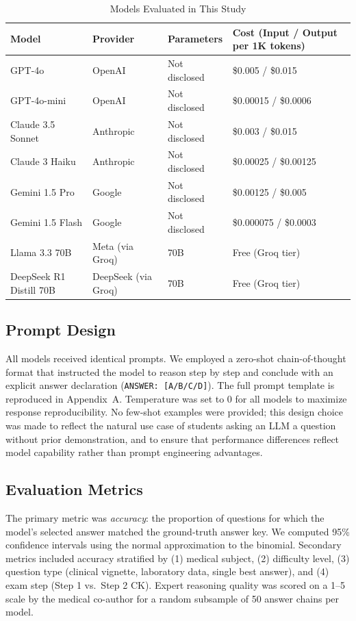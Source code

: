 \begin{table}[htbp]
\centering
\caption{Models Evaluated in This Study}
\label{tab:models}
\begin{tabular}{llll}
\toprule
Model & Provider & Parameters & Cost (Input / Output per 1K tokens) \\
\midrule
GPT-4o & OpenAI & Not disclosed & \$0.005 / \$0.015 \\
GPT-4o-mini & OpenAI & Not disclosed & \$0.00015 / \$0.0006 \\
Claude 3.5 Sonnet & Anthropic & Not disclosed & \$0.003 / \$0.015 \\
Claude 3 Haiku & Anthropic & Not disclosed & \$0.00025 / \$0.00125 \\
Gemini 1.5 Pro & Google & Not disclosed & \$0.00125 / \$0.005 \\
Gemini 1.5 Flash & Google & Not disclosed & \$0.000075 / \$0.0003 \\
Llama 3.3 70B & Meta (via Groq) & 70B & Free (Groq tier) \\
DeepSeek R1 Distill 70B & DeepSeek (via Groq) & 70B & Free (Groq tier) \\
\bottomrule
\end{tabular}
\end{table}

\subsection{Prompt Design}

All models received identical prompts. We employed a zero-shot chain-of-thought format that instructed the model to reason step by step and conclude with an explicit answer declaration (\texttt{ANSWER: [A/B/C/D]}). The full prompt template is reproduced in Appendix~A. Temperature was set to 0 for all models to maximize response reproducibility. No few-shot examples were provided; this design choice was made to reflect the natural use case of students asking an LLM a question without prior demonstration, and to ensure that performance differences reflect model capability rather than prompt engineering advantages.

\subsection{Evaluation Metrics}

The primary metric was \textit{accuracy}: the proportion of questions for which the model's selected answer matched the ground-truth answer key. We computed 95\% confidence intervals using the normal approximation to the binomial. Secondary metrics included accuracy stratified by (1) medical subject, (2) difficulty level, (3) question type (clinical vignette, laboratory data, single best answer), and (4) exam step (Step 1 vs.\ Step 2 CK). Expert reasoning quality was scored on a 1–5 scale by the medical co-author for a random subsample of 50 answer chains per model.

